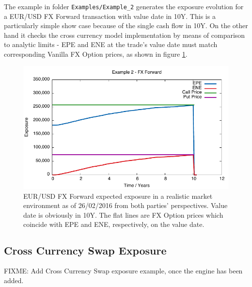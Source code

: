 \documentclass[12pt, a4paper]{article}
\begin{document}
The example in folder {\tt Examples/Example\_2} generates the exposure evolution for a EUR/USD FX Forward transaction with value date in 10Y. This is a particularly simple show case because of the single cash flow in 10Y. On the other hand it checks the cross currency model implementation by means of comparison to analytic limits - EPE and ENE at the trade's value date must match corresponding Vanilla FX Option prices, as shown in figure \ref{fig_5}.  
\begin{figure}[hbt]
\begin{center}
\includegraphics[scale=1.0]{example_fxforward.pdf}
\end{center}
\caption{EUR/USD FX Forward expected exposure in a realistic market environment as of 26/02/2016 from both parties' perspectives. Value date is obviously in 10Y. The flat lines are FX Option prices which coincide with EPE and ENE, respectively, on the value date.}
\label{fig_5}
\end{figure}

\subsection{Cross Currency Swap Exposure}

FIXME: Add Cross Currency Swap exposure example, once the engine has been added.
\end{document}
